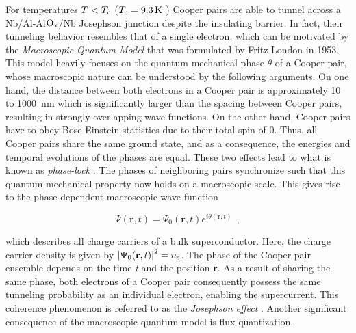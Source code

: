For temperatures $T < T_{\rm c}$ ($T_{\rm c}  = \qty{9.3}{\kelvin}$ \cite{Inaba_1980}) Cooper pairs are able to tunnel across a Nb/Al-Al$\rm O_x$/Nb Josephson junction despite the insulating barrier.	In fact, their tunneling behavior resembles that of a single electron, which can be motivated by the  \textit{Macroscopic Quantum Model} that was formulated by Fritz London in 1953. This model heavily focuses on the quantum mechanical phase $\theta$ of a Cooper pair, whose macroscopic nature can be understood by the following arguments. On one hand, the distance between both electrons in a Cooper pair is approximately 10 to \qty{1000}{\nm} which is significantly larger than the spacing between Cooper pairs, resulting in strongly overlapping wave functions. On the other hand, Cooper pairs have to obey Bose-Einstein statistics due to their total spin of 0. Thus, all Cooper pairs share the same ground state, and as a consequence, the energies and temporal evolutions of the phases are equal. These two effects lead to what is known as \textit{phase-lock} \cite{Gross2016}. The phases of neighboring pairs synchronize such that this quantum mechanical property now holds on a macroscopic scale. This gives rise to the phase-dependent macroscopic wave function

\begin{equation}
\Psi(\textbf{r},t) = \Psi_0(\textbf{r},t)e^{i\theta(\textbf{r},t)} \ \ ,
\end{equation}

which describes all charge carriers of a bulk superconductor. Here, the charge carrier density is given by $\left|\Psi_0(\textbf{r},t)\right|^2 = n_{\rm s}$. The phase of the Cooper pair ensemble depends on the time \textit{t} and the position \textbf{r}. As a result of sharing the same phase, both electrons of a Cooper pair consequently possess the same tunneling probability as an individual electron, enabling the supercurrent. This coherence phenomenon is referred to as the \textit{Josephson effect} \cite{Josephson1962}. Another significant consequence of the macroscopic quantum model is flux quantization. 

